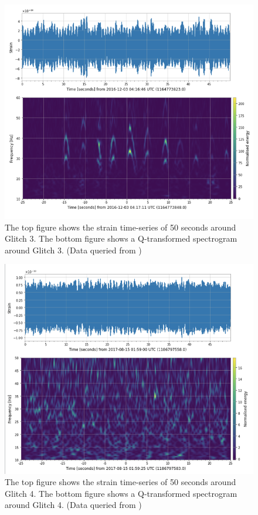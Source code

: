 \documentclass[reprint,
letterpaper,
 amsmath,amssymb,
 aps,
]{revtex4-2}
\begin{document}
\begin{figure}[h]
\caption{The top figure shows the strain time-series of 50 seconds around Glitch 3. The bottom figure shows a Q-transformed spectrogram around Glitch 3. (Data queried from \cite{collaboration2019open})}
\includegraphics[scale = .75]{Scattered Light Graphics.png}
\centering
\end{figure} 
\begin{figure}[h]
\caption{The top figure shows the strain time-series of 50 seconds around Glitch 4. The bottom figure shows a Q-transformed spectrogram around Glitch 4. (Data queried from \cite{collaboration2019open})}
\includegraphics[scale = .6]{power line graphics.png}
\centering
\end{figure} 
\end{document}
